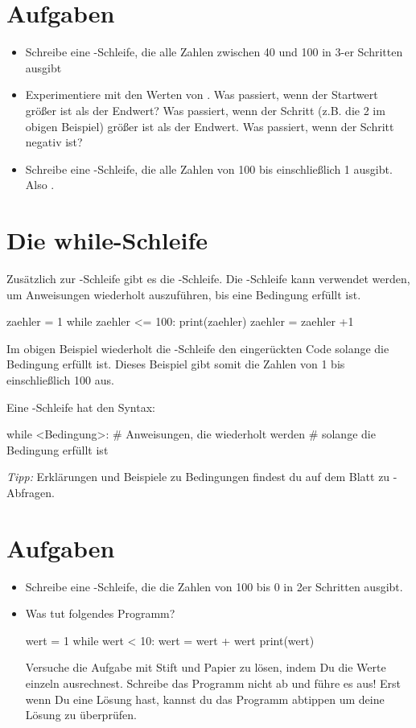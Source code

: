 \documentclass{\VorlagenPfad/coderdojokatext}
\begin{document}
\section{Aufgaben}
\begin{itemize}
	\item Schreibe eine -Schleife, die alle Zahlen zwischen 40 und 100 in 3-er Schritten ausgibt
	\item Experimentiere mit den Werten von . Was passiert, wenn der Startwert größer ist als der Endwert? Was passiert, wenn der Schritt (z.B. die 2 im obigen Beispiel) größer ist als der Endwert. Was passiert, wenn der Schritt negativ ist?
	\item Schreibe eine -Schleife, die alle Zahlen von 100 bis einschließlich 1 ausgibt. Also .
\end{itemize}

\section{Die while-Schleife} Zusätzlich zur -Schleife gibt es die -Schleife. Die -Schleife kann verwendet werden, um Anweisungen wiederholt auszuführen, bis eine Bedingung erfüllt ist.

\begin{pythoncode}
zaehler = 1
while zaehler <= 100:
	print(zaehler)
	zaehler = zaehler +1
\end{pythoncode}
Im obigen Beispiel wiederholt die -Schleife den eingerückten Code solange die Bedingung  erfüllt ist. Dieses Beispiel gibt somit die Zahlen von 1 bis einschließlich 100 aus.

\begin{merkbox}
Eine -Schleife hat den Syntax:
\begin{pythoncode}
while <Bedingung>:
	# Anweisungen, die wiederholt werden
	# solange die Bedingung erfüllt ist
\end{pythoncode}
\emph{Tipp:} Erklärungen und Beispiele zu Bedingungen findest du auf dem Blatt zu -Abfragen.
\end{merkbox}

\section{Aufgaben}
\begin{itemize}
	\item Schreibe eine -Schleife, die die Zahlen von 100 bis 0 in 2er Schritten ausgibt.
	\item
	
	Was tut folgendes Programm?
	\\
	
	\begin{pythoncode}
wert = 1
while wert < 10:
	wert = wert + wert
	print(wert)
	\end{pythoncode}
	Versuche die Aufgabe mit Stift und Papier zu lösen, indem Du die Werte einzeln ausrechnest. Schreibe das Programm nicht ab und führe es aus! Erst wenn Du eine Lösung hast, kannst du das Programm abtippen um deine Lösung zu überprüfen.
	
\end{itemize}
\end{document}
